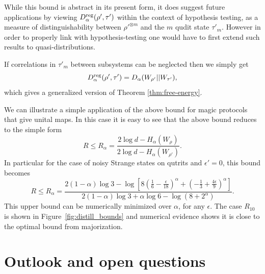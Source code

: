 \documentclass[pra,
aps,
twocolumn,
superscriptaddress,
groupedaddress,
nofootinbib,
reprint
]{revtex4-1}
\begin{document}
While this bound is abstract in its present form, it does suggest future applications by viewing $D^{\rm reg}_\alpha( \rho', \tau')$ within the context of hypothesis testing, as a measure of distinguishability between $\rho'^{\otimes m}$ and the $m$ qudit state $\tau'_m$. 
However in order to properly link with hypothesis-testing one would have to first extend such results to quasi-distributions.

If correlations in $\tau'_m$ between subsystems can be neglected then we simply get
\begin{equation}
D^{\rm reg}_\alpha( \rho', \tau') = D_\alpha (W_{\rho'} || W_{\tau'}),
\end{equation}
which gives a generalized version of Theorem \ref{thm:free-energy}.

We can illustrate a simple application of the above bound for magic protocols that give unital maps. In this case it is easy to see that the above bound reduces to the simple form
\begin{equation}
	R \leq R_\alpha=\frac{2\log d - H_{\alpha}(W_\rho)}{2\log d - H_{\alpha}(W_{\rho'})}.
\end{equation}
In particular for the case of noisy Strange states on qutrits and $\epsilon'=0$, this bound becomes
\begin{equation}
	R \leq R_\alpha=\frac{2(1-\alpha)\log 3 - \log \left [8(\frac{1}{6} - \frac{\epsilon}{18})^\alpha + (-\frac{1}{3} + \frac{4\epsilon}{9})^\alpha\right ] }{2(1-\alpha)\log 3 + \alpha \log 6 - \log (8 + 2^\alpha )}.
\end{equation}
This upper bound can be numerically minimized over $\alpha$, for any $\epsilon$. The case $R_{10}$ is shown in Figure~\ref{fig:distill_bounds} and numerical evidence shows it is close to the optimal bound from majorization.
%

\section{Outlook and open questions}
\label{sec:lower_bounds}
\end{document}
